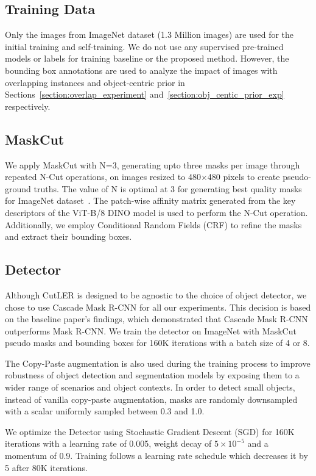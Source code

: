 \subsection{Training Data}
Only the images from ImageNet dataset (1.3 Million images) are used for the initial training and self-training. We do not use any supervised pre-trained models or labels for training baseline or the proposed method. However, the bounding box annotations are used to analyze the impact of images with overlapping instances and object-centric prior in Sections~\ref{section:overlap_experiment} and~\ref{section:obj_centic_prior_exp} respectively.

\subsection{MaskCut}

We apply MaskCut with N=3, generating upto three masks per image through repeated N-Cut operations, on images resized to 480×480 pixels to create pseudo-ground truths. The value of N is optimal at 3 for generating best quality masks for ImageNet dataset~\cite{wang2023cut}. The patch-wise affinity matrix generated from the key descriptors of the ViT-B/8 DINO model is used to perform the N-Cut operation. Additionally, we employ Conditional Random Fields (CRF) to refine the masks and extract their bounding boxes.

\subsection{Detector}
Although CutLER is designed to be agnostic to the choice of object detector, we chose to use Cascade Mask R-CNN for all our experiments. This decision is based on the baseline paper's findings, which demonstrated that Cascade Mask R-CNN outperforms Mask R-CNN. We train the detector on ImageNet with MaskCut pseudo masks and bounding boxes for 160K iterations with a batch size of 4 or 8. 

The Copy-Paste augmentation is also used during the training process to improve robustness of object detection and segmentation models by exposing them to a wider range of scenarios and object contexts. In order to detect small objects, instead of vanilla copy-paste augmentation, masks are randomly downsampled with a scalar uniformly sampled between 0.3 and 1.0. 

We optimize the Detector using Stochastic Gradient Descent (SGD) for 160K iterations with a learning rate of 0.005, weight decay of \(5×10^{−5}\) and a momentum of 0.9. Training follows a learning rate schedule which decreases it by 5 after 80K iterations.

